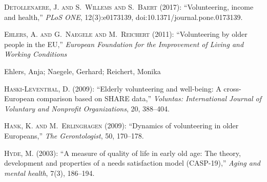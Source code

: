 \documentclass[10pt, letterpaper]{article}
\begin{document}
\begin{spacing}{1.4}
\begin{thebibliography}{87}
\textsc{Detollenaere, J. and S.~Willems and S.~Baert} (2017): \enquote{Volunteering, income and health,} \emph{PLoS ONE}, 12(3):e0173139,  doi:10.1371/journal.pone.0173139.

\textsc{Ehlers, A. and G.~Naegele and M.~Reichert} (2011): \enquote{Volunteering by older people in the EU,} \emph{European Foundation for the Improvement of Living and Working Conditions} 

Ehlers, Anja; Naegele, Gerhard; Reichert, Monika

\textsc{Haski-Leventhal, D.} (2009): \enquote{Elderly volunteering and
  well-being: A cross-European comparison based on SHARE data,} \emph{Voluntas:
  International Journal of Voluntary and Nonprofit Organizations}, 20, 388--404.
  
  
\textsc{Hank, K. and M.~Erlinghagen} (2009): \enquote{Dynamics of volunteering in older Europeans,} \emph{The Gerontologist}, 50, 170--178.  

\textsc{Hyde, M.} (2003): \enquote{A measure of quality of life in early old age: The theory, development and properties of a needs satisfaction model (CASP-19),} \emph{Aging and mental health}, 7(3), 186--194. 



\end{thebibliography}
\end{spacing}
\end{document}
